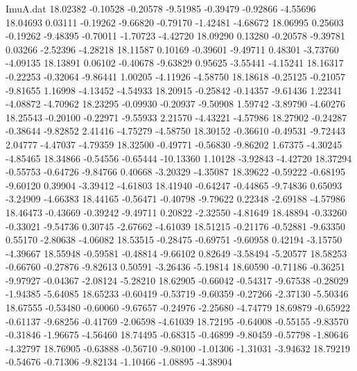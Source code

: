 \begin{filecontents}{ImuA.dat}
  18.02382   -0.10528   -0.20578   -9.51985   -0.39479   -0.92866   -4.55696
  18.04693    0.03111   -0.19262   -9.66820   -0.79170   -1.42481   -4.68672
  18.06995    0.25603   -0.19262   -9.48395   -0.70011   -1.70723   -4.42720
  18.09290    0.13280   -0.20578   -9.39781    0.03266   -2.52396   -4.28218
  18.11587    0.10169   -0.39601   -9.49711    0.48301   -3.73760   -4.09135
  18.13891    0.06102   -0.40678   -9.63829    0.95625   -3.55441   -4.15241
  18.16317   -0.22253   -0.32064   -9.86441    1.00205   -4.11926   -4.58750
  18.18618   -0.25125   -0.21057   -9.81655    1.16998   -4.13452   -4.54933
  18.20915   -0.25842   -0.14357   -9.61436    1.22341   -4.08872   -4.70962
  18.23295   -0.09930   -0.20937   -9.50908    1.59742   -3.89790   -4.60276
  18.25543   -0.20100   -0.22971   -9.55933    2.21570   -4.43221   -4.57986
  18.27902   -0.24287   -0.38644   -9.82852    2.41416   -4.75279   -4.58750
  18.30152   -0.36610   -0.49531   -9.72443    2.04777   -4.47037   -4.79359
  18.32500   -0.49771   -0.56830   -9.86202    1.67375   -4.30245   -4.85465
  18.34866   -0.54556   -0.65444  -10.13360    1.10128   -3.92843   -4.42720
  18.37294   -0.55753   -0.64726   -9.84766    0.40668   -3.20329   -4.35087
  18.39622   -0.59222   -0.68195   -9.60120    0.39904   -3.39412   -4.61803
  18.41940   -0.64247   -0.44865   -9.74836    0.65093   -3.24909   -4.66383
  18.44165   -0.56471   -0.40798   -9.79622    0.22348   -2.69188   -4.57986
  18.46473   -0.43669   -0.39242   -9.49711    0.20822   -2.32550   -4.81649
  18.48894   -0.33260   -0.33021   -9.54736    0.30745   -2.67662   -4.61039
  18.51215   -0.21176   -0.52881   -9.63350    0.55170   -2.80638   -4.06082
  18.53515   -0.28475   -0.69751   -9.60958    0.42194   -3.15750   -4.39667
  18.55948   -0.59581   -0.48814   -9.66102    0.82649   -3.58494   -5.20577
  18.58253   -0.66760   -0.27876   -9.82613    0.50591   -3.26436   -5.19814
  18.60590   -0.71186   -0.36251   -9.97927   -0.04367   -2.08124   -5.28210
  18.62905   -0.66042   -0.54317   -9.67538   -0.28029   -1.94385   -5.64085
  18.65233   -0.60419   -0.53719   -9.60359   -0.27266   -2.37130   -5.50346
  18.67555   -0.53480   -0.60060   -9.67657   -0.24976   -2.25680   -4.74779
  18.69879   -0.65922   -0.61137   -9.68256   -0.41769   -2.06598   -4.61039
  18.72195   -0.64008   -0.55155   -9.83570   -0.31846   -1.96675   -4.56460
  18.74495   -0.68315   -0.46899   -9.80459   -0.57798   -1.80646   -4.32797
  18.76905   -0.63888   -0.56710   -9.80100   -1.01306   -1.31031   -3.94632
  18.79219   -0.54676   -0.71306   -9.82134   -1.10466   -1.08895   -4.38904

\end{filecontents}
